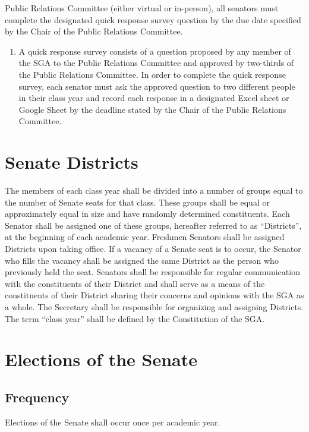 \documentclass[12pt]{scrreprt}
\begin{document}
\begin{enumerate}
Public Relations Committee (either virtual or in-person), all senators must complete the designated quick response survey question by the due date specified by the Chair of
the Public Relations Committee.
    \begin{enumerate}
        \item A quick response survey consists of a question proposed by any member of
the SGA to the Public Relations Committee and approved by two-thirds of the
Public Relations Committee. In order to complete the quick response survey,
each senator must ask the approved question to two different people in their
class year and record each response in a designated Excel sheet or Google
Sheet by the deadline stated by the Chair of the Public Relations Committee.
    \end{enumerate}
\end{enumerate}

\section{Senate Districts}
The members of each class year shall be divided into a number of groups equal to the number of Senate seats for that class. These groups shall be equal or approximately equal in size and have randomly determined constituents. Each Senator shall be assigned one of these groups, hereafter referred to as “Districts”, at the beginning of each academic year. Freshmen Senators shall be assigned Districts upon taking office. If a vacancy of a Senate seat is to occur, the Senator who fills the vacancy shall be assigned the same District as the person who previously held the seat. Senators shall be responsible for regular communication with the constituents of their District and shall serve as a means of the constituents of their District sharing their concerns and opinions with the SGA as a whole. The Secretary shall be responsible for organizing and assigning Districts. The term “class year” shall be defined by the Constitution of the SGA.

\section{Elections of the Senate}

\subsection{Frequency}
Elections of the Senate shall occur once per academic year. 
\end{document}
